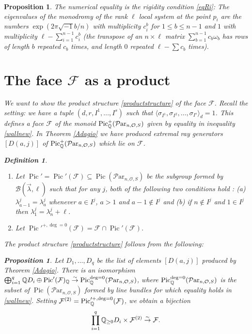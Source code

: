 \documentclass[11pt]{amsart}
\newcommand\mf{\mathcal{F}}
\newcommand\Pic{\operatorname{Pic}}
\newcommand\Par{\mathcal{P}\text{ar} }
\newcommand{\leto}[1]{\stackrel{#1}{\to}}
\newtheorem{proposition}[theorem]{Proposition}
\newtheorem{defi}[theorem]{Definition}
\numberwithin{theorem}{subsection}
\begin{document}
{\begin{proposition}
 The numerical equality is the rigidity condition \eqref{eqRi}: The eigenvalues of the monodromy of the rank $\ell$ local system at the point $p_i$ are the numbers $\exp(2\pi\sqrt{-1}b/n)$ with multiplicity $c^b_i$ for $1\leq b\leq n-1$ and $1$ with multiplicity $\ell-\sum_{i=1}^{n-1} c^b_i$ (the transpose of an $n\times \ell$ matrix $\sum_{b=1}^{n-1} c_b\omega_b$ has rows of length $b$ repeated $c_b$ times, and length $0$ repeated $\ell-\sum c_b$ times).

\fi

\section{The face $\mf$ as a product}
We want to show the product structure \eqref{productstructure} of the face $\mf$. Recall the setting:
we have a tuple $(d,r,I^1,\dots,I^s)$ such that
$\langle\sigma_{I^1}, \sigma_{I^2},\dots,\sigma_{I^s}\rangle_{d}=1$. This defines a face $\mf$  of the monoid
$\Pic^+_{\Bbb{Q}}(\Par_{n,\mathcal{O},S})$ given by equality in inequality
\eqref{wallnew}. In Theorem \ref{Adagio} we have produced extremal ray generators $[D(a,j)]$ of $\Pic^+_{\Bbb{Q}}(\Par_{n,\mathcal{O},S})$ which lie on $\mf$.

\begin{defi}\label{Br2}
\hspace{2em}
\begin{enumerate}
\item Let $\Pic'=\Pic'(\mf)\subseteq\Pic(\Par_{n,\mathcal{O},S})$ be the subgroup formed by  $\mathcal{B}(\vec{\lambda},\ell)$ such that for any $j$, both of the following two conditions hold : (a) $\lambda^j_{a-1}=\lambda^{j}_{a}$ whenever $a\in I^j$, $a>1$ and $a-1\not \in I^j$ and (b) if $n\not\in I^j$ and $1\in I^j$ then $\lambda^j_1=\lambda^{j}_{n}+\ell$.
\item  Let $\Pic'^{+,\deg=0}(\mf)=\mf\cap \Pic'(\mf)$.
\end{enumerate}
\end{defi}

The product structure \eqref{productstructure} follows from the following:
\begin{proposition}\label{Br4} Let $D_1,\dots, D_q$ be the list of elements $[D(a,j)]$ produced by Theorem \ref{Adagio}. There is an isomorphism
$\bigoplus_{i=1}^{q}\Bbb{Q}D_i \oplus  \Pic' (\mf)_{\Bbb{Q}}\leto{\sim} \Pic^{\deg=0}_{\Bbb{Q}}(\Par_{n,\mathcal{O},S})$, where $\Pic^{\deg=0}_{\Bbb{Q}}(\Par_{n,\mathcal{O},S})$ is the subset of $\Pic(\Par_{n,\mathcal{O},S})$ formed by line bundles for which equality holds in
\eqref{wallnew}.
Setting $\mf^{(2)}= \Pic'^{+,\deg=0}_{\Bbb{Q}}(\mf) $, we obtain a bijection
$$\prod_{i=1}^{q}\Bbb{Q}_{\geq 0}D_i \times  \mf^{(2)} \leto{\sim} \mf.$$
\end{proposition}





\end{proposition}}
\end{document}
